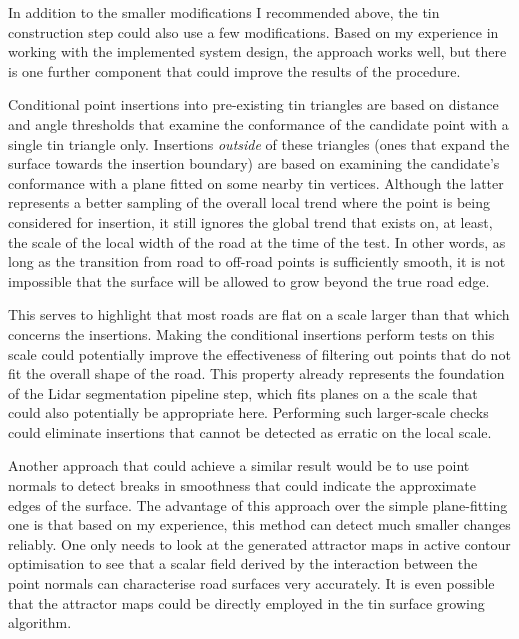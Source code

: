 In addition to the smaller modifications I recommended above, the \ac{tin} construction step could also use a few modifications. Based on my experience in working with the implemented system design, the approach works well, but there is one further component that could improve the results of the procedure.

Conditional point insertions into pre-existing \ac{tin} triangles are based on distance and angle thresholds that examine the conformance of the candidate point with a single \ac{tin} triangle only. Insertions \textit{outside} of these triangles (ones that expand the surface towards the insertion boundary) are based on examining the candidate's conformance with a plane fitted on some nearby \ac{tin} vertices. Although the latter represents a better sampling of the overall local trend where the point is being considered for insertion, it still ignores the global trend that exists on, at least, the scale of the local width of the road at the time of the test. In other words, as long as the transition from road to off-road points is sufficiently smooth, it is not impossible that the surface will be allowed to grow beyond the true road edge.

This serves to highlight that most roads are flat on a scale larger than that which concerns the insertions. Making the conditional insertions perform tests on this scale could potentially improve the effectiveness of filtering out points that do not fit the overall shape of the road. This property already represents the foundation of the Lidar segmentation pipeline step, which fits planes on a the scale that could also potentially be appropriate here. Performing such larger-scale checks could eliminate insertions that cannot be detected as erratic on the local scale.

Another approach that could achieve a similar result would be to use point normals to detect breaks in smoothness that could indicate the approximate edges of the surface. The advantage of this approach over the simple plane-fitting one is that based on my experience, this method can detect much smaller changes reliably. One only needs to look at the generated attractor maps in active contour optimisation to see that a scalar field derived by the interaction between the point normals can characterise road surfaces very accurately. It is even possible that the attractor maps could be directly employed in the \ac{tin} surface growing algorithm.

